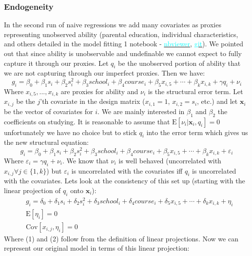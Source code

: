\documentclass[12pt]{article}
\newcommand{\E}{\mathrm{E}}
\newcommand{\Cov}{\mathrm{Cov}}
\begin{document}
\subsubsection{Endogeneity} \label{endogeneity}
In the second run of naive regressions we add many covariates as proxies representing unobserved ability (parental education, individual characteristics, and others detailed in the model fitting 1 notebook - \href{https://nbviewer.jupyter.org/github/nadavtadelis/Reproducible_Metrics/blob/master/model_fitting_1.ipynb}{\textcolor{cyan}{nbviewer}}, \href{https://github.com/nadavtadelis/Reproducible_Metrics/blob/master/model_fitting_1.ipynb}{\textcolor{cyan}{git}}). We pointed out that since ability is unobservable and undefinable we cannot expect to fully capture it through our proxies. Let $q_i$ be the unobserved portion of ability that we are not capturing through our imperfect proxies. Then we have:
$$
g_i = \beta_0 + \beta_1 s_i + \beta_2 s_i^2 + \beta_3 school_i + \beta_4 course_i + \beta_5 x_{i,5} + \cdots + \beta_k x_{i,k} + \gamma q_i + \nu_i
$$
Where $x_{i,5}, ..., x_{i,k}$ are proxies for ability and $\nu_i$ is the structural error term. Let $x_{i,j}$ be the $j$'th covariate in the design matrix ($x_{i,1} = 1$, $x_{i,2} = s_i$, etc.) and let $\bm{x}_i$ be the vector of covariates for $i$. We are mainly interested in $\beta_1$ and $\beta_2$ the coefficients on studying. It is reasonable to assume that $\E[\nu_i | \bm{x}_i, q_i] = 0$ unfortunately we have no choice but to stick $q_i$ into the error term which gives us the new structural equation:
$$
g_i = \beta_0 + \beta_1 s_i + \beta_2 s_i^2 + \beta_3 school_i + \beta_4 course_i + \beta_5 x_{i,5} + \cdots + \beta_k x_{i,k} + \varepsilon_i
$$
Where $\varepsilon_i = \gamma q_i + \nu_i$. We know that $\nu_i$ is well behaved (uncorrelated with $x_{i,j} \forall j \in \{1,k\}$) but $\varepsilon_i$ is uncorrelated with the covariates iff $q_i$ is uncorrelated with the covariates. Lets look at the consistency of this set up (starting with the linear projection of $q_i$ onto $\bm{x}_i$):
\begin{align}
&g_i = \delta_0 + \delta_1 s_i + \delta_2 s_i^2 + \delta_3 school_i + \delta_4 course_i + \delta_5 x_{i,5} + \cdots + \delta_k x_{i,k} + \eta_i  \nonumber \\
&\E[\eta_i] = 0 \\
&\Cov[x_{i,j}, \eta_i] = 0
\end{align}
Where (1) and (2) follow from the definition of linear projections. Now we can represent our original model in terms of this linear projection:
\end{document}
